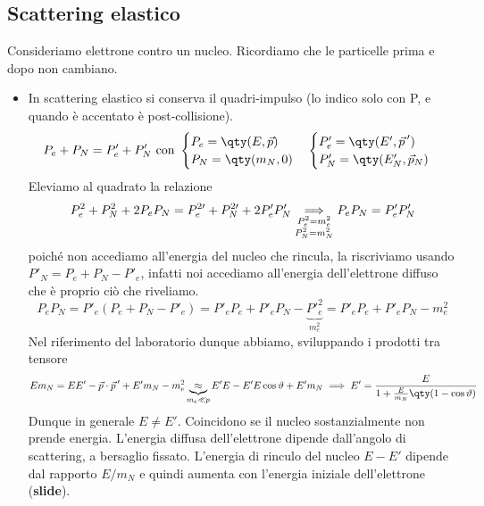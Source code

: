 \subsection{Scattering elastico}
Consideriamo elettrone contro un nucleo. Ricordiamo che le particelle prima e dopo non cambiano.
\begin{itemize}
    \item In scattering elastico si conserva il quadri-impulso (lo indico solo con P, e quando è accentato è post-collisione).
    \begin{equation*}
        P_e+P_N=P'_e+P'_N\text{ con }
        \begin{cases}
            P_e=\qty(E,\vec p)\\
            P_N=\qty(m_N,0)
        \end{cases}
        \begin{cases}
            P'_e=\qty(E',{\vec{p}\,}')\\
            P'_N=\qty(E'_N,\vec p_N)
        \end{cases}
    \end{equation*}
    Eleviamo al quadrato la relazione 
    \begin{equation*}
        P_e^2+P_N^2+2P_eP_N=P_e^{2\prime}+P_N^{2\prime}+2P'_eP'_N\underset{
        \begin{subarray}{c}
            P_e^2=m_e^2\\
            P_N^2=m_N^2
         \end{subarray}
        }{\implies}P_eP_N=P'_eP'_N
    \end{equation*}
    poiché non accediamo all'energia del nucleo che rincula, la riscriviamo usando $P'_N=P_e+P_N-P'_e$, infatti noi accediamo all'energia dell'elettrone diffuso che è proprio ciò che riveliamo.
    \begin{equation*}
        P_eP_N=P'_e(P_e+P_N-P'_e)=P'_eP_e+P'_eP_N-\underbrace{P'^2_e}_{m_e^2}=P'_eP_e+P'_eP_N-m_e^2
    \end{equation*}
    Nel riferimento del laboratorio dunque abbiamo, sviluppando i prodotti tra tensore
    \begin{equation*}
        Em_N=EE'-\vec p\cdot{\vec{p}\,}'+E'm_N-m_e^2\underbrace{\approx}_{m_e\ll p}E'E-E'E\cos\vartheta+E'm_N\implies E'=\frac E{1+\frac E{m_N}\qty(1-\cos\vartheta)}
    \end{equation*}
    Dunque in generale $E\neq E'$. Coincidono se il nucleo sostanzialmente non prende energia. L'energia diffusa dell'elettrone dipende dall'angolo di scattering, a bersaglio fissato. L'energia di rinculo del nucleo $E-E'$ dipende dal rapporto $E/m_N$ e quindi aumenta con l'energia iniziale dell'elettrone (\textbf{slide}).
\end{itemize}
